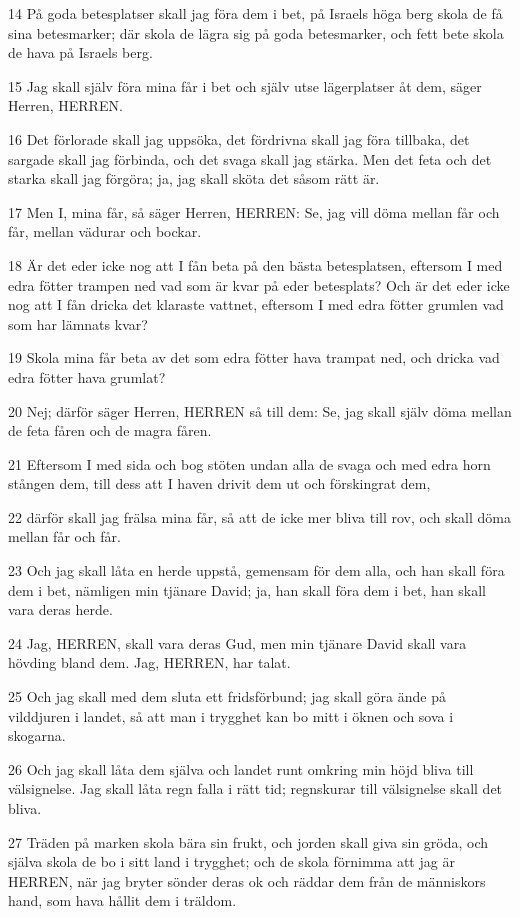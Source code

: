 \par 14 På goda betesplatser skall jag föra dem i bet, på Israels höga berg skola de få sina betesmarker; där skola de lägra sig på goda betesmarker, och fett bete skola de hava på Israels berg.
\par 15 Jag skall själv föra mina får i bet och själv utse lägerplatser åt dem, säger Herren, HERREN.
\par 16 Det förlorade skall jag uppsöka, det fördrivna skall jag föra tillbaka, det sargade skall jag förbinda, och det svaga skall jag stärka. Men det feta och det starka skall jag förgöra; ja, jag skall sköta det såsom rätt är.
\par 17 Men I, mina får, så säger Herren, HERREN: Se, jag vill döma mellan får och får, mellan vädurar och bockar.
\par 18 Är det eder icke nog att I fån beta på den bästa betesplatsen, eftersom I med edra fötter trampen ned vad som är kvar på eder betesplats? Och är det eder icke nog att I fån dricka det klaraste vattnet, eftersom I med edra fötter grumlen vad som har lämnats kvar?
\par 19 Skola mina får beta av det som edra fötter hava trampat ned, och dricka vad edra fötter hava grumlat?
\par 20 Nej; därför säger Herren, HERREN så till dem: Se, jag skall själv döma mellan de feta fåren och de magra fåren.
\par 21 Eftersom I med sida och bog stöten undan alla de svaga och med edra horn stången dem, till dess att I haven drivit dem ut och förskingrat dem,
\par 22 därför skall jag frälsa mina får, så att de icke mer bliva till rov, och skall döma mellan får och får.
\par 23 Och jag skall låta en herde uppstå, gemensam för dem alla, och han skall föra dem i bet, nämligen min tjänare David; ja, han skall föra dem i bet, han skall vara deras herde.
\par 24 Jag, HERREN, skall vara deras Gud, men min tjänare David skall vara hövding bland dem. Jag, HERREN, har talat.
\par 25 Och jag skall med dem sluta ett fridsförbund; jag skall göra ände på vilddjuren i landet, så att man i trygghet kan bo mitt i öknen och sova i skogarna.
\par 26 Och jag skall låta dem själva och landet runt omkring min höjd bliva till välsignelse. Jag skall låta regn falla i rätt tid; regnskurar till välsignelse skall det bliva.
\par 27 Träden på marken skola bära sin frukt, och jorden skall giva sin gröda, och själva skola de bo i sitt land i trygghet; och de skola förnimma att jag är HERREN, när jag bryter sönder deras ok och räddar dem från de människors hand, som hava hållit dem i träldom.
